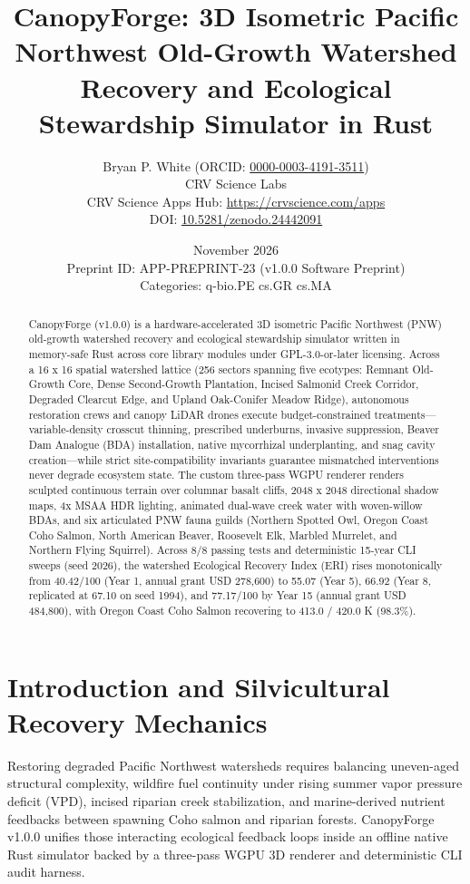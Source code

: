 \documentclass[10pt,letterpaper]{article}
\title{\textbf{CanopyForge: 3D Isometric Pacific Northwest Old-Growth Watershed Recovery and Ecological Stewardship Simulator in Rust}}
\author{Bryan P. White (ORCID: \href{https://orcid.org/0000-0003-4191-3511}{0000-0003-4191-3511}) \\ CRV Science Labs \\ \small CRV Science Apps Hub: \url{https://crvscience.com/apps} \\ \small DOI: \href{https://doi.org/10.5281/zenodo.24442091}{10.5281/zenodo.24442091}}
\date{November 2026 \\ \small Preprint ID: APP-PREPRINT-23 (v1.0.0 Software Preprint) \\ \small Categories: q-bio.PE \textbullet{} cs.GR \textbullet{} cs.MA}
\begin{document}
\maketitle

\begin{abstract}
CanopyForge (v1.0.0) is a hardware-accelerated 3D isometric Pacific Northwest (PNW) old-growth watershed recovery and ecological stewardship simulator written in memory-safe Rust across core library modules under GPL-3.0-or-later licensing. Across a 16 x 16 spatial watershed lattice (256 sectors spanning five ecotypes: Remnant Old-Growth Core, Dense Second-Growth Plantation, Incised Salmonid Creek Corridor, Degraded Clearcut Edge, and Upland Oak-Conifer Meadow Ridge), autonomous restoration crews and canopy LiDAR drones execute budget-constrained treatments---variable-density crosscut thinning, prescribed underburns, invasive suppression, Beaver Dam Analogue (BDA) installation, native mycorrhizal underplanting, and snag cavity creation---while strict site-compatibility invariants guarantee mismatched interventions never degrade ecosystem state. The custom three-pass WGPU renderer renders sculpted continuous terrain over columnar basalt cliffs, 2048 x 2048 directional shadow maps, 4x MSAA HDR lighting, animated dual-wave creek water with woven-willow BDAs, and six articulated PNW fauna guilds (Northern Spotted Owl, Oregon Coast Coho Salmon, North American Beaver, Roosevelt Elk, Marbled Murrelet, and Northern Flying Squirrel). Across 8/8 passing tests and deterministic 15-year CLI sweeps (seed 2026), the watershed Ecological Recovery Index (ERI) rises monotonically from 40.42/100 (Year 1, annual grant USD 278,600) to 55.07 (Year 5), 66.92 (Year 8, replicated at 67.10 on seed 1994), and 77.17/100 by Year 15 (annual grant USD 484,800), with Oregon Coast Coho Salmon recovering to 413.0 / 420.0 K (98.3\%).
\end{abstract}

\section{Introduction and Silvicultural Recovery Mechanics}
Restoring degraded Pacific Northwest watersheds requires balancing uneven-aged structural complexity, wildfire fuel continuity under rising summer vapor pressure deficit (VPD), incised riparian creek stabilization, and marine-derived nutrient feedbacks between spawning Coho salmon and riparian forests. CanopyForge v1.0.0 unifies those interacting ecological feedback loops inside an offline native Rust simulator backed by a three-pass WGPU 3D renderer and deterministic CLI audit harness.
\end{document}
